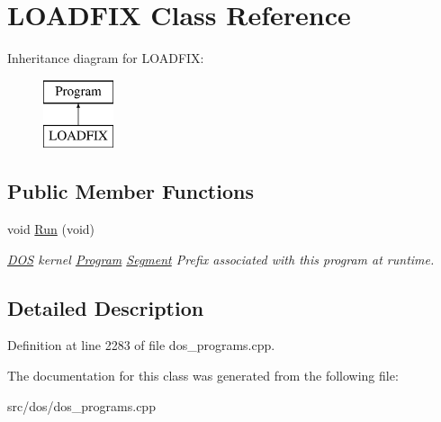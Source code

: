\hypertarget{classLOADFIX}{\section{L\-O\-A\-D\-F\-I\-X Class Reference}
\label{classLOADFIX}
}
Inheritance diagram for L\-O\-A\-D\-F\-I\-X\-:\begin{figure}[H]
\begin{center}
\leavevmode
\includegraphics[height=2.000000cm]{classLOADFIX}
\end{center}
\end{figure}
\subsection*{Public Member Functions}
\begin{DoxyCompactItemize}
\item 
\hypertarget{classLOADFIX_a2edbc9814c14ed39a0410473df0bcc36}{void \hyperlink{classLOADFIX_a2edbc9814c14ed39a0410473df0bcc36}{Run} (void)}\label{classLOADFIX_a2edbc9814c14ed39a0410473df0bcc36}

\begin{DoxyCompactList}\small\item\em \hyperlink{classDOS}{D\-O\-S} kernel \hyperlink{classProgram}{Program} \hyperlink{structSegment}{Segment} Prefix associated with this program at runtime. \end{DoxyCompactList}\end{DoxyCompactItemize}


\subsection{Detailed Description}


Definition at line 2283 of file dos\-\_\-programs.\-cpp.



The documentation for this class was generated from the following file\-:\begin{DoxyCompactItemize}
\item 
src/dos/dos\-\_\-programs.\-cpp\end{DoxyCompactItemize}
